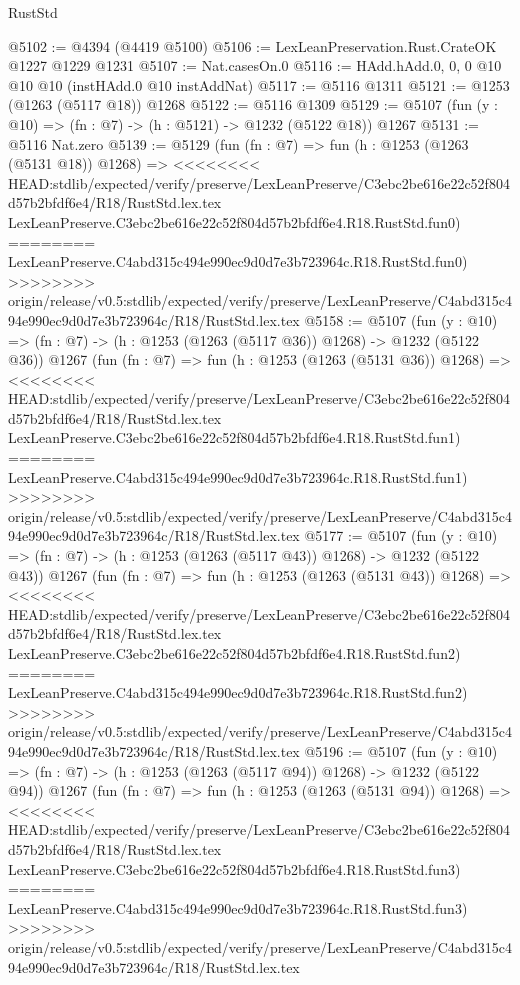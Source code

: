 \begin{lexlean}{RustStd}
\begin{coremodule}
{\begin{coremodule}
{{{{{{{{{{{@5102 := @4394 (@4419 @5100)
@5106 := LexLeanPreservation.Rust.CrateOK @1227 @1229 @1231
@5107 := Nat.casesOn.{0}
@5116 := HAdd.hAdd.{0, 0, 0} @10 @10 @10 (instHAdd.{0} @10 instAddNat)
@5117 := @5116 @1311
@5121 := @1253 (@1263 (@5117 @18)) @1268
@5122 := @5116 @1309
@5129 := @5107 (fun (y : @10) => (fn : @7) -> (h : @5121) -> @1232 (@5122 @18)) @1267
@5131 := @5116 Nat.zero
@5139 := @5129
    (fun (fn : @7) =>
    fun (h : @1253 (@1263 (@5131 @18)) @1268) =>
<<<<<<<< HEAD:stdlib/expected/verify/preserve/LexLeanPreserve/C3ebc2be616e22c52f804d57b2bfdf6e4/R18/RustStd.lex.tex
    LexLeanPreserve.C3ebc2be616e22c52f804d57b2bfdf6e4.R18.RustStd.fun0)
========
    LexLeanPreserve.C4abd315c494e990ec9d0d7e3b723964c.R18.RustStd.fun0)
>>>>>>>> origin/release/v0.5:stdlib/expected/verify/preserve/LexLeanPreserve/C4abd315c494e990ec9d0d7e3b723964c/R18/RustStd.lex.tex
@5158 := @5107
    (fun (y : @10) => (fn : @7) -> (h : @1253 (@1263 (@5117 @36)) @1268) -> @1232 (@5122 @36))
    @1267
    (fun (fn : @7) =>
    fun (h : @1253 (@1263 (@5131 @36)) @1268) =>
<<<<<<<< HEAD:stdlib/expected/verify/preserve/LexLeanPreserve/C3ebc2be616e22c52f804d57b2bfdf6e4/R18/RustStd.lex.tex
    LexLeanPreserve.C3ebc2be616e22c52f804d57b2bfdf6e4.R18.RustStd.fun1)
========
    LexLeanPreserve.C4abd315c494e990ec9d0d7e3b723964c.R18.RustStd.fun1)
>>>>>>>> origin/release/v0.5:stdlib/expected/verify/preserve/LexLeanPreserve/C4abd315c494e990ec9d0d7e3b723964c/R18/RustStd.lex.tex
@5177 := @5107
    (fun (y : @10) => (fn : @7) -> (h : @1253 (@1263 (@5117 @43)) @1268) -> @1232 (@5122 @43))
    @1267
    (fun (fn : @7) =>
    fun (h : @1253 (@1263 (@5131 @43)) @1268) =>
<<<<<<<< HEAD:stdlib/expected/verify/preserve/LexLeanPreserve/C3ebc2be616e22c52f804d57b2bfdf6e4/R18/RustStd.lex.tex
    LexLeanPreserve.C3ebc2be616e22c52f804d57b2bfdf6e4.R18.RustStd.fun2)
========
    LexLeanPreserve.C4abd315c494e990ec9d0d7e3b723964c.R18.RustStd.fun2)
>>>>>>>> origin/release/v0.5:stdlib/expected/verify/preserve/LexLeanPreserve/C4abd315c494e990ec9d0d7e3b723964c/R18/RustStd.lex.tex
@5196 := @5107
    (fun (y : @10) => (fn : @7) -> (h : @1253 (@1263 (@5117 @94)) @1268) -> @1232 (@5122 @94))
    @1267
    (fun (fn : @7) =>
    fun (h : @1253 (@1263 (@5131 @94)) @1268) =>
<<<<<<<< HEAD:stdlib/expected/verify/preserve/LexLeanPreserve/C3ebc2be616e22c52f804d57b2bfdf6e4/R18/RustStd.lex.tex
    LexLeanPreserve.C3ebc2be616e22c52f804d57b2bfdf6e4.R18.RustStd.fun3)
========
    LexLeanPreserve.C4abd315c494e990ec9d0d7e3b723964c.R18.RustStd.fun3)
>>>>>>>> origin/release/v0.5:stdlib/expected/verify/preserve/LexLeanPreserve/C4abd315c494e990ec9d0d7e3b723964c/R18/RustStd.lex.tex
}}}}}}}}}}}
\end{coremodule}}
\end{coremodule}
\end{lexlean}

